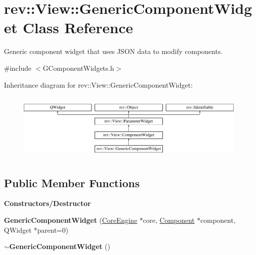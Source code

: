 \hypertarget{classrev_1_1_view_1_1_generic_component_widget}{}\section{rev\+::View\+::Generic\+Component\+Widget Class Reference}
\label{classrev_1_1_view_1_1_generic_component_widget}


Generic component widget that uses J\+S\+ON data to modify components.  




{\ttfamily \#include $<$G\+Component\+Widgets.\+h$>$}

Inheritance diagram for rev\+::View\+::Generic\+Component\+Widget\+:\begin{figure}[H]
\begin{center}
\leavevmode
\includegraphics[height=3.318518cm]{classrev_1_1_view_1_1_generic_component_widget}
\end{center}
\end{figure}
\subsection*{Public Member Functions}
\begin{Indent}\textbf{ Constructors/\+Destructor}\par
\begin{DoxyCompactItemize}
\item 
\mbox{\label{classrev_1_1_view_1_1_generic_component_widget_a7c3d8948bf1e3a196db3f744c7b9ee5f}} 
{\bfseries Generic\+Component\+Widget} (\mbox{\hyperlink{classrev_1_1_core_engine}{Core\+Engine}} $\ast$core, \mbox{\hyperlink{classrev_1_1_component}{Component}} $\ast$component, Q\+Widget $\ast$parent=0)
\item 
\mbox{\label{classrev_1_1_view_1_1_generic_component_widget_abe134f89f8280ff36eb2f4bc1451907d}} 
{\bfseries $\sim$\+Generic\+Component\+Widget} ()
\end{DoxyCompactItemize}
\end{Indent}
